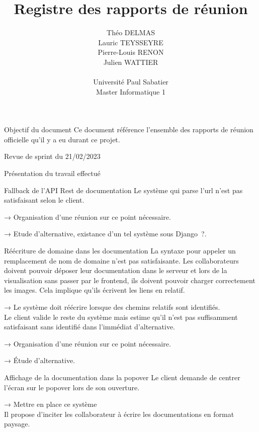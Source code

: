\documentclass[]{article}
\title{Registre des rapports de réunion}
\author{
    Théo DELMAS\\
    Lauric TEYSSEYRE\\
    Pierre-Louis RENON\\
    Julien WATTIER\\
    \\
    Université Paul Sabatier\\
    Master Informatique 1\\
   }
\begin{document}
\maketitle
\newpage
\tableofcontents
\newpage

\begin{section}{Objectif du document}
 Ce document référence l'ensemble des rapports de réunion officielle qu'il y a eu durant ce projet.
\end{section}

{
\setlength{\parindent}{0pt} %
\begin{section}{Revue de sprint du 21/02/2023}
 \begin{subsection}{Présentation du travail effectué}
     \begin{subsubsection}{Fallback de l’API Rest de documentation}
         Le système qui parse l’url n’est pas satisfaisant selon le client.

         → Organisation d’une réunion sur ce point nécessaire.

         → Etude d’alternative, existance d’un tel système sous Django ?.
     \end{subsubsection}

     \begin{subsubsection}{Réécriture de domaine dans les documentation}
         La syntaxe pour appeler un remplacement de nom de domaine n’est pas satisfaisante. Les collaborateurs doivent pouvoir déposer leur documentation dans le serveur et lors de la visualisation sans passer par le frontend, ils doivent pouvoir charger correctement les images. Cela implique qu’ils écrivent les liens en relatif.

         → Le système doit réécrire lorsque des chemins relatifs sont identifiés.
         \\[5mm]
         Le client valide le reste du système mais estime qu’il n’est pas suffisamment satisfaisant sans identifié dans l’immédiat d’alternative.

         → Organisation d’une réunion sur ce point nécessaire.

         → Étude d’alternative.
     \end{subsubsection}

     \begin{subsubsection}{Affichage de la documentation dans la popover}
         Le client demande de centrer l’écran sur le popover lors de son ouverture.

         → Mettre en place ce système
         \\[5mm]
         Il propose d’inciter les collaborateur à écrire les documentations en format paysage.


\end{subsubsection}
\end{subsection}
\end{section}}
\end{document}
